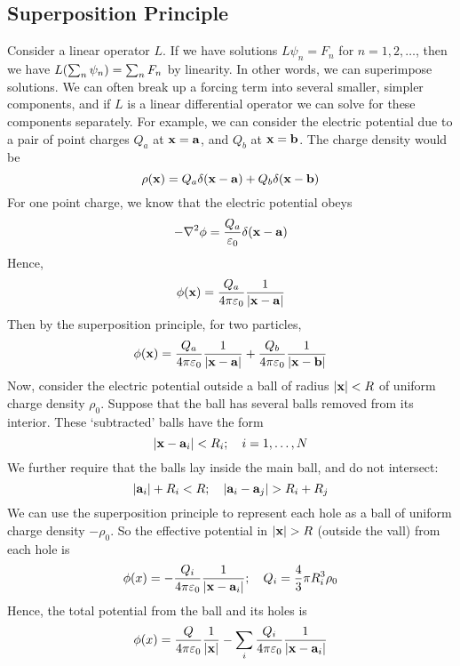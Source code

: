 \subsection{Superposition Principle}
Consider a linear operator $L$. If we have solutions $L \psi_n = F_n$ for $n = 1, 2, \dots$, then we have $L\qty(\sum_n \psi_n) = \sum_n F_n$ by linearity. In other words, we can superimpose solutions. We can often break up a forcing term into several smaller, simpler components, and if $L$ is a linear differential operator we can solve for these components separately. For example, we can consider the electric potential due to a pair of point charges $Q_a$ at $\vb x = \vb a$, and $Q_b$ at $\vb x = \vb b$. The charge density would be
\[ \rho(\vb x) = Q_a \delta(\vb x - \vb a) + Q_b \delta(\vb x - \vb b) \]
For one point charge, we know that the electric potential obeys
\[ -\laplacian{\phi} = \frac{Q_a}{\varepsilon_0} \delta(\vb x - \vb a) \]
Hence,
\[ \phi(\vb x) = \frac{Q_a}{4\pi \varepsilon_0} \frac{1}{\abs{\vb x - \vb a}} \]
Then by the superposition principle, for two particles,
\[ \phi(\vb x) = \frac{Q_a}{4\pi \varepsilon_0} \frac{1}{\abs{\vb x - \vb a}} + \frac{Q_b}{4\pi \varepsilon_0} \frac{1}{\abs{\vb x - \vb b}} \]
Now, consider the electric potential outside a ball of radius $\abs{\vb x} < R$ of uniform charge density $\rho_0$. Suppose that the ball has several balls removed from its interior. These `subtracted' balls have the form
\[ \abs{\vb x - \vb a_i} < R_i;\quad i = 1, \dots, N \]
We further require that the balls lay inside the main ball, and do not intersect:
\[ \abs{\vb a_i} + R_i < R;\quad \abs{\vb a_i - \vb a_j} > R_i + R_j \]
We can use the superposition principle to represent each hole as a ball of uniform charge density $-\rho_0$. So the effective potential in $\abs{\vb x} > R$ (outside the vall) from each hole is
\[ \phi(x) = -\frac{Q_i}{4\pi\varepsilon_0} \frac{1}{\abs{\vb x - \vb a_i}};\quad Q_i = \frac{4}{3}\pi R_i^3 \rho_0 \]
Hence, the total potential from the ball and its holes is
\[ \phi(x) = \frac{Q}{4\pi\varepsilon_0} \frac{1}{\abs{\vb x}} - \sum_i\frac{Q_i}{4\pi\varepsilon_0} \frac{1}{\abs{\vb x - \vb a_i}} \]

